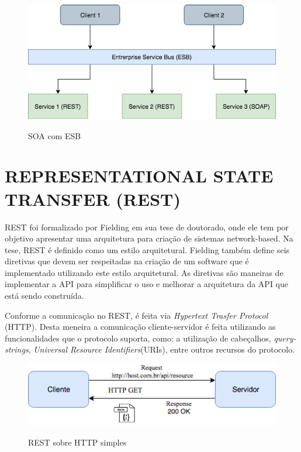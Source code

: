 \begin{figure}[!htb]
  \centering
  \caption{SOA com ESB}
  \includegraphics[width=1\textwidth]{./dados/figuras/SOA.png}
  \label{fig:soaesb}
\end{figure}

\section{REPRESENTATIONAL STATE TRANSFER (REST)}
REST foi formalizado por Fielding \cite{fielding} em sua tese de doutorado, onde ele tem por 
objetivo apresentar uma arquitetura para criação de sistemas network-based. 
Na tese, REST é definido como um estilo arquitetural. Fielding também define seis diretivas que 
devem ser respeitadas na criação de um software que é implementado utilizando este estilo arquitetural. 
As diretivas são maneiras de implementar a API para simplificar o uso e melhorar a 
arquitetura da API que está sendo construída. 

Conforme \cite{fielding} a comunicação no REST, é feita via \textit{Hypertext Trasfer Protocol} (HTTP). 
Desta meneira a comunicação cliente-servidor é feita utilizando as funcionalidades que o protocolo suporta,
como: a utilização de cabeçalhos, \textit{query-strings}, \textit{Universal Resource Identifiers}(URIs),
entre outros recursos do protocolo.

\begin{figure}[!htb]
  \centering
  \caption{REST sobre HTTP simples}
  \includegraphics[width=1\textwidth]{./dados/figuras/rest-1.png}
  \label{fig:rest1}
\end{figure}


